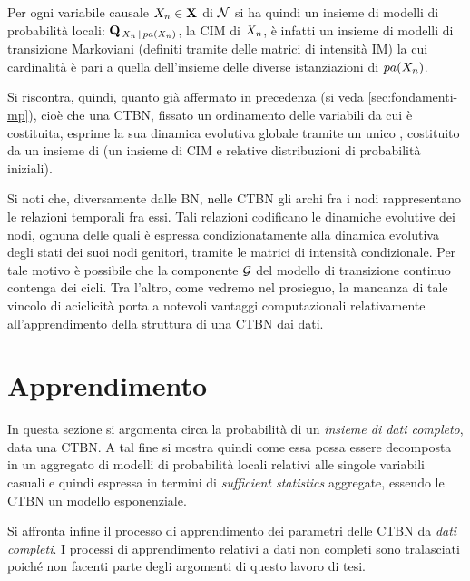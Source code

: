 Per ogni variabile causale $\mathnormal{X_n} \in \mathbf{X}$ di $\mathcal{N}$ si ha quindi un insieme di modelli di probabilità locali: $\mathbf{Q}_{\,\mathnormal{X_n}\,\arrowvert\,pa(\mathnormal{X_n})}$, la \acs{CIM} di $\mathnormal{X_n}$, è infatti un insieme di modelli di transizione Markoviani (definiti tramite delle matrici di intensità \acs{IM}) la cui cardinalità è pari a quella dell'insieme delle diverse istanziazioni di $pa(\mathnormal{X_n})$.

Si riscontra, quindi, quanto già affermato in precedenza (si veda \ref{sec:fondamenti-mp}), cioè che una \acs{CTBN}, fissato un ordinamento delle variabili da cui è costituita, esprime la sua dinamica evolutiva globale tramite un unico \homm\mprocess, costituito da un insieme di \conm\mprocess{} (un insieme di \acs{CIM} e relative distribuzioni di probabilità iniziali).

Si noti che, diversamente dalle \acl{BN}, nelle \acl{CTBN} gli archi fra i nodi rappresentano le relazioni temporali fra essi. Tali relazioni codificano le dinamiche evolutive dei nodi, ognuna delle quali è espressa condizionatamente alla dinamica evolutiva degli stati dei suoi nodi genitori, tramite le matrici di intensità condizionale. Per tale motivo è possibile che la componente $\mathcal{G}$ del modello di transizione continuo contenga dei cicli. Tra l'altro, come vedremo nel prosieguo, la mancanza di tale vincolo di aciclicità porta a notevoli vantaggi computazionali relativamente all'apprendimento della struttura di una \acs{CTBN} dai dati.

\section{Apprendimento}
\label{sec:ctbn-apprendimento}
In questa sezione si argomenta circa la probabilità di un \emph{insieme di dati completo}, data una \acl{CTBN}. A tal fine si mostra quindi come essa possa essere decomposta in un aggregato di modelli di probabilità locali relativi alle singole variabili casuali e quindi espressa in termini di \emph{sufficient statistics} aggregate, essendo le \acs{CTBN} un modello esponenziale.

Si affronta infine il processo di apprendimento dei parametri delle \acl{CTBN} da \emph{dati completi}. I processi di apprendimento relativi a dati non completi sono tralasciati poiché non facenti parte degli argomenti di questo lavoro di tesi.

